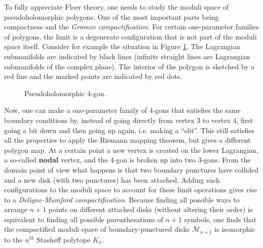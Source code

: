     \begin{property}
        To fully appreciate Floer theory, one needs to study the moduli space of pseudoholomorphic polygons. One of the most important parts being compactness and the \textit{Gromov compactification}. For certain one-parameter families of polygons, the limit is a degenerate configuration that is not part of the moduli space itself. Consider for example the situation in Figure \ref{fig:floer_breaking}. The Lagrangian submanifolds are indicated by black lines (infinite straight lines are Lagrangian submanifolds of the complex plane). The interior of the polygon is sketched by a red line and the marked points are indicated by red dots.

        \begin{figure}[ht!]
            \centering
            \caption{Pseudoholomorphic 4-gon.}
            \label{fig:floer_breaking}
        \end{figure}
        Now, one can make a one-parameter family of 4-gons that satisfies the same boundary conditions by, instead of going directly from vertex 3 to vertex 4, first going a bit down and then going up again, i.e. making a ``slit''. This still satisfies all the properties to apply the Riemann mapping theorem, but gives a different polygon map. At a certain point a new vertex is created on the lower Lagrangian, a so-called \textbf{nodal} vertex, and the 4-gon is broken up into two 3-gons. From the domain point of view what happens is that two boundary punctures have collided and a new disk (with two punctures) has been attached. Adding such configurations to the moduli space to account for these limit operations gives rise to a \textit{Deligne-Mumford compactification}. Because finding all possible ways to arrange $n+1$ points on different attached disks (without altering their order) is equivalent to finding all possible parenthesations of $n+1$ symbols, one finds that the compactified moduli space of boundary-punctured disks $\overline{\mathcal{M}}_{n+1}$ is isomorphic to the $n^{th}$ Stasheff polytope $K_n$.


\end{property}
